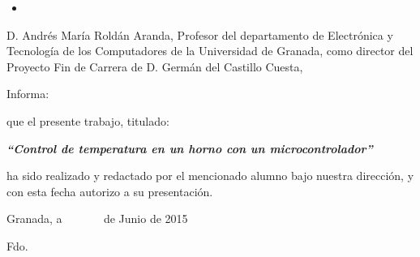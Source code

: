 \begin{itemize}
	\item [] 
\end{itemize}


\newpage


\newpage
\thispagestyle{empty}

\cleardoublepage
\thispagestyle{empty}
{}

\noindent D. Andrés María Roldán Aranda, Profesor del departamento
de Electrónica y Tecnología de los Computadores de la Universidad
de Granada, como director del Proyecto Fin de Carrera de D. Germán del Castillo Cuesta,

\vspace*{1cm}

Informa:

\begin{doublespace}
que el presente trabajo, titulado:
\end{doublespace}

\begin{doublespace}
\begin{center}
\textbf{\emph{\large {}``Control de temperatura en un horno con un microcontrolador''}}
\par\end{center}{\large \par}
\end{doublespace}

\noindent ha sido realizado y redactado por el mencionado alumno bajo
nuestra dirección, y con esta fecha autorizo a su presentación. 

\vspace*{1cm}

\begin{center}
Granada, a ~~~~~~ de Junio de 2015
\par\end{center}

\bigskip%
\bigskip%
\begin{doublespace}
\hspace{4cm}Fdo.
\end{doublespace}

\newpage
\thispagestyle{empty}
\noindent

\newpage
\thispagestyle{empty}

~

